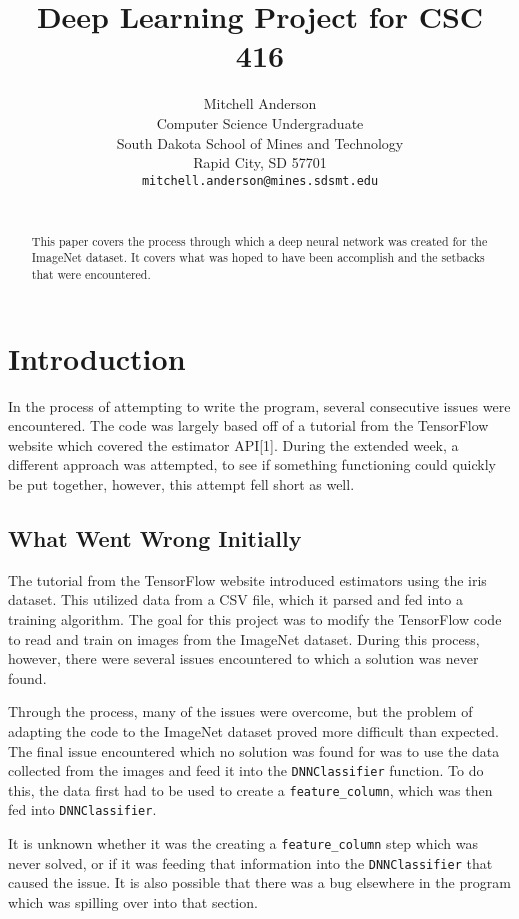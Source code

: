 \documentclass{article}
\title{Deep Learning Project for CSC 416}
\author{
  Mitchell Anderson \\
  Computer Science Undergraduate \\
  South Dakota School of Mines and Technology\\
  Rapid City, SD 57701 \\
  \texttt{mitchell.anderson@mines.sdsmt.edu} \\\
}
\begin{document}
\maketitle

\begin{abstract}
  This paper covers the process through which a deep 
  neural network was created for the ImageNet dataset. It
  covers what was hoped to have been accomplish and the setbacks
  that were encountered.
\end{abstract}

\section{Introduction}

In the process of attempting to write the program, several consecutive
issues were encountered. The code was largely based off of a tutorial
from the TensorFlow website which covered the estimator API[1]. During
the extended week, a different approach was attempted, to see if something
functioning could quickly be put together, however, this attempt fell short
as well.

\subsection{What Went Wrong Initially}

The tutorial from the TensorFlow website introduced estimators using
the iris dataset. This utilized data from a CSV file, which it parsed
and fed into a training algorithm. The goal for this project was to
modify the TensorFlow code to read and train on images from the ImageNet
dataset. During this process, however, there were several issues encountered
to which a solution was never found.

Through the process, many of the issues were overcome, but the problem
of adapting the code to the ImageNet dataset proved more difficult than
expected. The final issue encountered which no solution was found for
was to use the data collected from the images and feed it into the
\texttt{DNNClassifier} function. To do this, the data first had to be used to
create a \texttt{feature\_column}, which was then fed into \texttt{DNNClassifier}.

It is unknown whether it was the creating a \texttt{feature\_column} step which
was never solved, or if it was feeding that information into the
\texttt{DNNClassifier} that caused the issue. It is also possible that there
was a bug elsewhere in the program which was spilling over into that
section.
\end{document}
